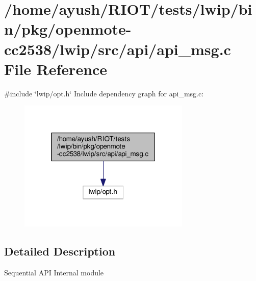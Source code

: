 \hypertarget{openmote-cc2538_2lwip_2src_2api_2api__msg_8c}{}\section{/home/ayush/\+R\+I\+O\+T/tests/lwip/bin/pkg/openmote-\/cc2538/lwip/src/api/api\+\_\+msg.c File Reference}
\label{openmote-cc2538_2lwip_2src_2api_2api__msg_8c}
{\ttfamily \#include \char`\"{}lwip/opt.\+h\char`\"{}}\newline
Include dependency graph for api\+\_\+msg.\+c\+:
\nopagebreak
\begin{figure}[H]
\begin{center}
\leavevmode
\includegraphics[width=232pt]{openmote-cc2538_2lwip_2src_2api_2api__msg_8c__incl}
\end{center}
\end{figure}


\subsection{Detailed Description}
Sequential A\+PI Internal module 